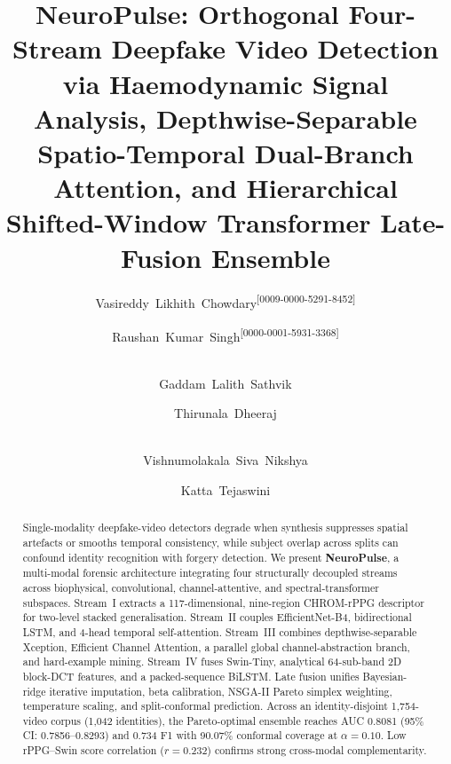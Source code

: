 \documentclass[runningheads]{llncs}
\begin{document}
\title{NeuroPulse: Orthogonal Four-Stream Deepfake Video Detection via Haemodynamic Signal Analysis, Depthwise-Separable Spatio-Temporal Dual-Branch Attention, and Hierarchical Shifted-Window Transformer Late-Fusion Ensemble}

\renewcommand{\orcidID}[1]{\unskip\textsuperscript{[#1]}}

\author{Vasireddy~Likhith~Chowdary\orcidID{0009-0000-5291-8452}\thinspace\textsuperscript{\Envelope} \and
        Raushan~Kumar~Singh\orcidID{0000-0001-5931-3368} \and \\
        Gaddam~Lalith~Sathvik \and
        Thirunala~Dheeraj \and \\
        Vishnumolakala~Siva~Nikshya \and
        Katta~Tejaswini}



\maketitle

\begin{abstract}
Single-modality deepfake-video detectors degrade when synthesis suppresses spatial artefacts or smooths temporal consistency, while subject overlap across splits can confound identity recognition with forgery detection. We present \textbf{NeuroPulse}, a multi-modal forensic architecture integrating four structurally decoupled streams across biophysical, convolutional, channel-attentive, and spectral-transformer subspaces. Stream~I extracts a 117-dimensional, nine-region CHROM-rPPG descriptor for two-level stacked generalisation. Stream~II couples EfficientNet-B4, bidirectional LSTM, and 4-head temporal self-attention. Stream~III combines depthwise-separable Xception, Efficient Channel Attention, a parallel global channel-abstraction branch, and hard-example mining. Stream~IV fuses Swin-Tiny, analytical 64-sub-band 2D block-DCT features, and a packed-sequence BiLSTM. Late fusion unifies Bayesian-ridge iterative imputation, beta calibration, NSGA-II Pareto simplex weighting, temperature scaling, and split-conformal prediction. Across an identity-disjoint 1,754-video corpus (1,042 identities), the Pareto-optimal ensemble reaches AUC 0.8081 (95\% CI: 0.7856--0.8293) and 0.734 F1 with 90.07\% conformal coverage at $\alpha{=}0.10$. Low rPPG--Swin score correlation ($r{=}0.232$) confirms strong cross-modal complementarity.
\end{abstract}
\end{document}
